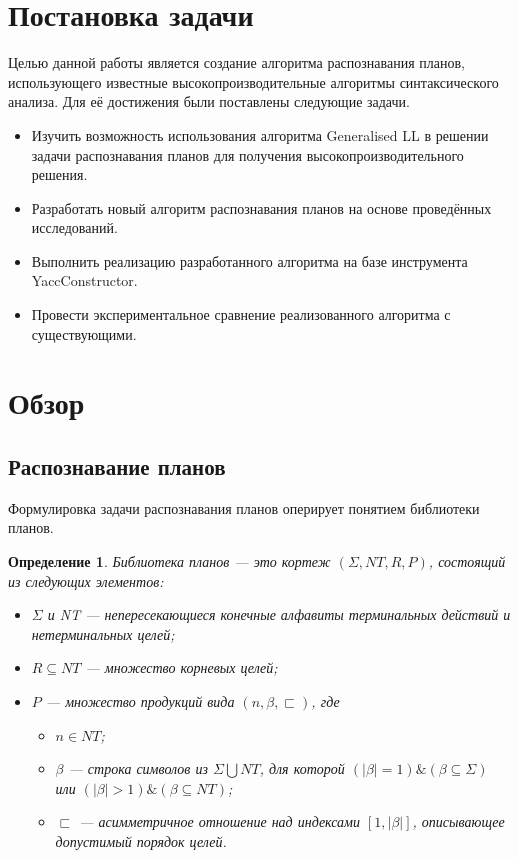 \documentclass[14pt]{matmex-diploma-custom}
\newtheorem{mydef}{Определение}
\begin{document}
	\section{Постановка задачи}
	
	Целью данной работы является создание алгоритма распознавания планов, использующего известные высокопроизводительные алгоритмы синтаксического анализа.
    Для её достижения были поставлены следующие задачи.
	
	\begin{itemize}
		\item Изучить возможность использования алгоритма Generalised LL в решении задачи распознавания планов для получения высокопроизводительного решения.
		\item Разработать новый алгоритм распознавания планов на основе проведённых исследований.
		\item Выполнить реализацию разработанного алгоритма на базе инструмента YaccConstructor.
		\item Провести экспериментальное сравнение реализованного алгоритма с существующими.
	\end{itemize}
		

    
    \section{Обзор}
    \subsection{Распознавание планов}
    Формулировка задачи распознавания планов оперирует понятием библиотеки планов.
    
    \begin{mydef}
    	Библиотека планов --- это кортеж $(\Sigma, NT, R, P)$, состоящий из следующих элементов:
    	\begin{itemize}
    		\item $\Sigma$ и NT --- непересекающиеся конечные алфавиты терминальных действий и нетерминальных целей;
    		\item $R \subseteq NT $ --- множество корневых целей;
    		\item $P$ --- множество продукций вида $(n, \beta, \sqsubset) $, где
    		\begin{itemize}
    			\item $n \in NT$;
    			\item $\beta$ --- строка символов из $ \Sigma \bigcup NT $, для которой $(|\beta| = 1)\&(\beta \subseteq \Sigma)$
    	или $(|\beta| > 1)\&(\beta \subseteq NT)$;
    			\item $ \sqsubset$ --- асимметричное отношение над индексами $[1, |\beta|]$, описывающее допустимый порядок целей.
    		\end{itemize}
    	\end{itemize}
    \end{mydef}
    
\end{document}

